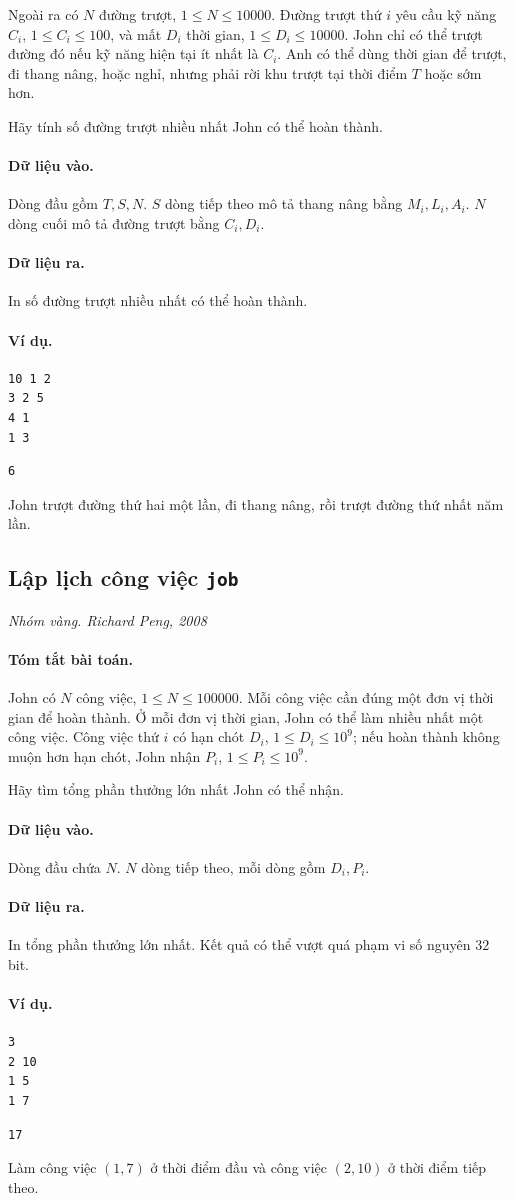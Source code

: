 \documentclass[11pt]{article}
\newcommand{\problem}[4]{%
  \subsection[#1 (#2)]{#1 \hfill {\normalsize\texttt{#2}}}%
  \noindent\textit{#3. #4}\par\smallskip
}
\newcommand{\iosec}[1]{\paragraph{#1}}
\begin{document}
Ngoài ra có \(N\) đường trượt, \(1\le N\le 10000\). Đường trượt thứ \(i\)
yêu cầu kỹ năng \(C_i\), \(1\le C_i\le 100\), và mất \(D_i\) thời gian,
\(1\le D_i\le 10000\). John chỉ có thể trượt đường đó nếu kỹ năng hiện tại
ít nhất là \(C_i\). Anh có thể dùng thời gian để trượt, đi thang nâng, hoặc
nghỉ, nhưng phải rời khu trượt tại thời điểm \(T\) hoặc sớm hơn.

Hãy tính số đường trượt nhiều nhất John có thể hoàn thành.

\iosec{Dữ liệu vào.}
Dòng đầu gồm \(T,S,N\). \(S\) dòng tiếp theo mô tả thang nâng bằng
\(M_i,L_i,A_i\). \(N\) dòng cuối mô tả đường trượt bằng \(C_i,D_i\).

\iosec{Dữ liệu ra.}
In số đường trượt nhiều nhất có thể hoàn thành.

\iosec{Ví dụ.}
\begin{verbatim}
10 1 2
3 2 5
4 1
1 3
\end{verbatim}

\begin{verbatim}
6
\end{verbatim}

John trượt đường thứ hai một lần, đi thang nâng, rồi trượt đường thứ nhất
năm lần.

\problem{Lập lịch công việc}{job}{Nhóm vàng}{Richard Peng, 2008}

\iosec{Tóm tắt bài toán.}
John có \(N\) công việc, \(1\le N\le 100000\). Mỗi công việc cần đúng một đơn
vị thời gian để hoàn thành. Ở mỗi đơn vị thời gian, John có thể làm nhiều
nhất một công việc. Công việc thứ \(i\) có hạn chót \(D_i\),
\(1\le D_i\le 10^9\); nếu hoàn thành không muộn hơn hạn chót, John nhận
\(P_i\), \(1\le P_i\le 10^9\).

Hãy tìm tổng phần thưởng lớn nhất John có thể nhận.

\iosec{Dữ liệu vào.}
Dòng đầu chứa \(N\). \(N\) dòng tiếp theo, mỗi dòng gồm \(D_i,P_i\).

\iosec{Dữ liệu ra.}
In tổng phần thưởng lớn nhất. Kết quả có thể vượt quá phạm vi số nguyên
\(32\) bit.

\iosec{Ví dụ.}
\begin{verbatim}
3
2 10
1 5
1 7
\end{verbatim}

\begin{verbatim}
17
\end{verbatim}

Làm công việc \((1,7)\) ở thời điểm đầu và công việc \((2,10)\) ở thời điểm
tiếp theo.
\end{document}

